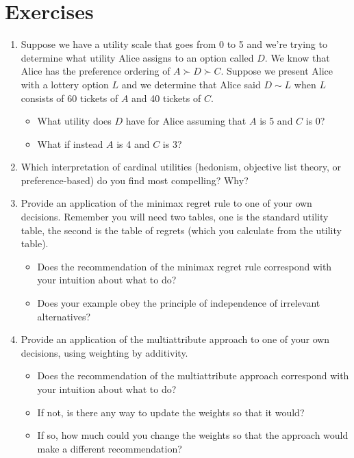 \documentclass[]{tufte-book}
\providecommand{\tightlist}{%
  \setlength{\itemsep}{0pt}\setlength{\parskip}{0pt}}
\begin{document}
\hypertarget{exercises-3}{%
\section*{Exercises}\label{exercises-3}}

\begin{enumerate}
\def\labelenumi{\arabic{enumi}.}
\item
  Suppose we have a utility scale that goes from 0 to 5 and we're trying to determine what utility Alice assigns to an option called \(D\). We know that Alice has the preference ordering of \(A\succ D \succ C\). Suppose we present Alice with a lottery option \(L\) and we determine that Alice said \(D \sim L\) when \(L\) consists of 60 tickets of \(A\) and 40 tickets of \(C\).

  \begin{itemize}
  \tightlist
  \item
    What utility does \(D\) have for Alice assuming that \(A\) is 5 and \(C\) is 0?
  \item
    What if instead \(A\) is 4 and \(C\) is 3?
  \end{itemize}
\item
  Which interpretation of cardinal utilities (hedonism, objective list theory, or preference-based) do you find most compelling? Why?
\item
  Provide an application of the minimax regret rule to one of your own decisions. Remember you will need two tables, one is the standard utility table, the second is the table of regrets (which you calculate from the utility table).

  \begin{itemize}
  \tightlist
  \item
    Does the recommendation of the minimax regret rule correspond with your intuition about what to do?
  \item
    Does your example obey the principle of independence of irrelevant alternatives?
  \end{itemize}
\item
  Provide an application of the multiattribute approach to one of your own decisions, using weighting by additivity.

  \begin{itemize}
  \tightlist
  \item
    Does the recommendation of the multiattribute approach correspond with your intuition about what to do?
  \item
    If not, is there any way to update the weights so that it would?
  \item
    If so, how much could you change the weights so that the approach would make a different recommendation?
  \end{itemize}
\end{enumerate}
\end{document}
